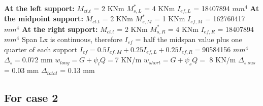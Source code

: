 \documentclass{article}%
\begin{document}
%
\newline%
\newline%
%
\textbf{At the left support:}%
\newline%
\newline%
%
$M_{ct.t}$ = 2 KNm%
\newline%
%
$M_{s,L}^{*}$ = 4 KNm%
\newline%
%
$I_{ef,L}$ = 18407894 $mm^{4}$%
\newline%
\newline%
%
\textbf{At the midpoint support:}%
\newline%
\newline%
%
$M_{ct.t}$ = 2 KNm%
\newline%
%
$M_{s,M}^{*}$ = 1 KNm%
\newline%
%
$I_{ef,M}$ = 162760417 $mm^{4}$%
\newline%
\newline%
%
\textbf{At the right support:}%
\newline%
\newline%
%
$M_{ct.t}$ = 2 KNm%
\newline%
%
$M_{s,R}^{*}$ = 4 KNm%
\newline%
%
$I_{ef,R}$ = 18407894 $mm^{4}$%
\newline%
\newline%
%
Span Lx is continuous, therefore $I_{ef}$ = half the midspan value plus one quarter of each support%
\newline%
\newline%
%
$I_{ef} = 0.5I_{ef,M} + 0.25I_{ef,L} + 0.25I_{ef,R} = $90584156 $ mm^{4}$%
\newline%
\newline%
%
$\Delta_{s} =$0.072 mm%
\newline%
\newline%
%
$w_{long} = G + \psi_{l}Q = $7 KN/m%
\newline%
%
$w_{short} = G + \psi_{s}Q = $ 8 KN/m%
\newline%
\newline%
%
$\Delta_{s.sus}$ = 0.03 mm%
\newline%
\newline%
%
$\Delta_{total}$ = 0.13 mm%
\subsection*{For case 2}%
\label{subsec:Forcase2}%
\end{document}

